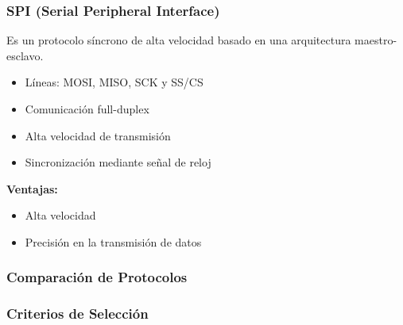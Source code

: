 \documentclass[conference]{IEEEtran}
\begin{document}
\subsubsection{SPI (Serial Peripheral Interface)}

Es un protocolo síncrono de alta velocidad basado en una arquitectura maestro-esclavo.

\begin{itemize}
    \item Líneas: MOSI, MISO, SCK y SS/CS
    \item Comunicación full-duplex
    \item Alta velocidad de transmisión
    \item Sincronización mediante señal de reloj
\end{itemize}

\textbf{Ventajas:}
\begin{itemize}
    \item Alta velocidad
    \item Precisión en la transmisión de datos
\end{itemize}

\subsubsection{Comparación de Protocolos}

\begin{center}
\end{center}  

\subsubsection{Criterios de Selección}
\end{document}
